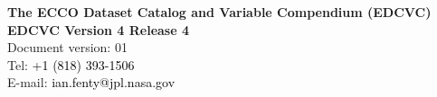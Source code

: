 \documentclass[letterpaper]{article}
\begin{document}






\begin{center}
    \vspace*{2cm}
    {\Large \textbf{The ECCO Dataset Catalog and Variable Compendium (EDCVC)}}\\[3cm]
    {\LARGE \textbf{EDCVC Version 4 Release 4}}\\[2.5cm]
    {\Large Document version: 01}\\[4cm]
    {\large Tel: \textcolor{black}{+1 (818) 393-1506}\\[.5cm]
    E-mail: \textcolor{black}{ian.fenty@jpl.nasa.gov}}\\[2cm]
\end{center}
\end{document}
